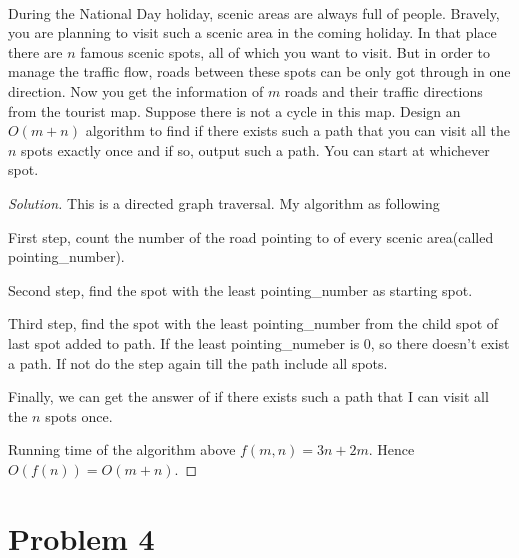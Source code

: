 \documentclass[a4paper]{article}
\newenvironment{solution}
  {\renewcommand\qedsymbol{$\blacksquare$}\begin{proof}[Solution]}
  {\end{proof}}
\begin{document}
\paragraph{}
During the National Day holiday, scenic areas are always full of people. Bravely, you are planning to
visit such a scenic area in the coming holiday. In that place there are $n$ famous scenic spots, all of which you
want to visit. But in order to manage the traffic flow, roads between these spots can be only got through
in one direction. Now you get the information of $m$ roads and their traffic directions from the tourist map.
Suppose there is not a cycle in this map. Design an $O(m + n)$ algorithm to find if there exists such a path
that you can visit all the $n$ spots exactly once and if so, output such a path. You can start at whichever
spot.
\begin{solution}
  This is a directed graph traversal. My algorithm as following

  First step, count the number of the road pointing to of every scenic area(called pointing\_number).

  Second step, find the spot with the least pointing\_number as starting spot.

  Third step, find the spot with the least pointing\_number from the child spot of last spot added to path.
  If the least pointing\_numeber is $0$, so there doesn't exist a path. If not do the step again till the path
  include all spots.

  Finally, we can get the answer of if there exists such a path that I can visit all the $n$ spots once.

  Running time of the algorithm above $f(m,n)=3n+2m$. Hence $O(f(n))=O(m+n)$.
\end{solution}

\section*{Problem 4}
\end{document}
